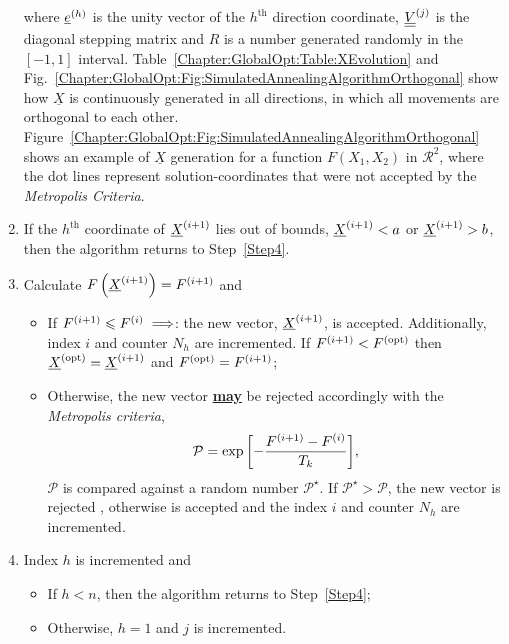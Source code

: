 \begin{enumerate}[{\bf Step 1: }]
where $\mfr[\underline{e}]{}{h}$ is the unity vector of the $h^{\text{th}}$ direction coordinate, $\mfr[\underline{\underline{V}}]{}{j}$ is the diagonal stepping matrix and $R$ is a number generated randomly in the $[-1,1]$ interval. Table~\ref{Chapter:GlobalOpt:Table:XEvolution} and Fig.~\ref{Chapter:GlobalOpt:Fig:SimulatedAnnealingAlgorithmOrthogonal} show how $\underline{X}$ is continuously generated in all directions, in which all movements are orthogonal to each other. Figure~\ref{Chapter:GlobalOpt:Fig:SimulatedAnnealingAlgorithmOrthogonal} shows an example of $\underline{X}$ generation for a function $F\left(X_{1},X_{2}\right)$ in $\mathcal{R}^{2}$, where the dot lines represent solution-coordinates that were not accepted by the {\it Metropolis Criteria}.

   \item\label{Step5} If the $h^{\text{th}}$ coordinate of $\mfr[\underline{X}]{}{i+1}$ lies out of bounds, \ie $\mfr[\underline{X}]{}{i+1} < a$ or $\mfr[\underline{X}]{}{i+1} > b$, then the algorithm returns to Step~\ref{Step4}.

   \item\label{Step6} Calculate $F\left(\mfr[\underline{X}]{}{i+1}\right) = \mfr[F]{}{i+1}$ and
       \begin{itemize}
           \item If $\mfr[F]{}{i+1}\le \mfr[F]{}{i}\;\Longrightarrow$: the new vector, $\mfr[\underline{X}]{}{i+1}$,  is accepted. Additionally, index $i$ and counter $N_{h}$ are incremented. If $\mfr[F]{}{i+1} < \mfr[F]{}{\text{opt}}$ then $\mfr[\underline{X}]{}{\text{opt}} = \mfr[\underline{X}]{}{i+1}$ and $\mfr[F]{}{\text{opt}} = \mfr[F]{}{i+1}$;
           \item Otherwise, the new vector {\bf\underline{may}} be rejected accordingly with the {\it Metropolis criteria},
               \begin{equation}
                   \mathcal{P} = \exp{\left[-\frc{\mfr[F]{}{i+1}-\mfr[F]{}{i}}{T_{k}}\right]}, \label{Chapter:GlobalOpt:Eqn:MetropolisCriteria}
               \end{equation}
$\mathcal{P}$ is compared against a random number $\mathcal{P}^{\star}$. If $\mathcal{P}^{\star}>\mathcal{P}$, the new vector is rejected , otherwise is accepted and the index $i$ and counter $N_{h}$ are incremented.
       \end{itemize}

   \item\label{Step7} Index $h$ is incremented and
       \begin{itemize}
           \item If $h<n$, then the algorithm returns to Step~\ref{Step4};
           \item Otherwise, $h=1$ and $j$ is incremented.
       \end{itemize}


\end{enumerate}
